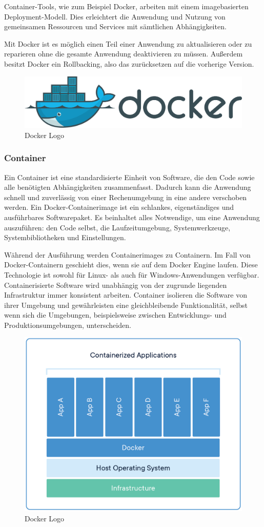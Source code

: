 Container-Tools, wie zum Beispiel Docker, arbeiten mit einem imagebasierten Deployment-Modell. Dies erleichtert die Anwendung und Nutzung von gemeinsamen Ressourcen und Services mit sämtlichen Abhängigkeiten.

Mit Docker ist es möglich einen Teil einer Anwendung zu aktualisieren oder zu reparieren ohne die gesamte Anwendung deaktivieren zu müssen. Außerdem besitzt Docker ein Rollbacking, also das zurücksetzen auf die vorherige Version.

\begin{figure}[h!]
    \centering
    \includegraphics[width=0.7\linewidth]{pics/docker-logo.png}
    \caption{Docker Logo}
    \label{fig:enter-label}
\end{figure}

\subsubsection{Container}
Ein Container ist eine standardisierte Einheit von Software, die den Code sowie alle benötigten Abhängigkeiten zusammenfasst. Dadurch kann die Anwendung schnell und zuverlässig von einer Rechenumgebung in eine andere verschoben werden. Ein Docker-Containerimage ist ein schlankes, eigenständiges und ausführbares Softwarepaket. Es beinhaltet alles Notwendige, um eine Anwendung auszuführen: den Code selbst, die Laufzeitumgebung, Systemwerkzeuge, Systembibliotheken und Einstellungen.\newline

Während der Ausführung werden Containerimages zu Containern. Im Fall von Docker-Containern geschieht dies, wenn sie auf dem Docker Engine laufen. Diese Technologie ist sowohl für Linux- als auch für Windows-Anwendungen verfügbar. Containerisierte Software wird unabhängig von der zugrunde liegenden Infrastruktur immer konsistent arbeiten. Container isolieren die Software von ihrer Umgebung und gewährleisten eine gleichbleibende Funktionalität, selbst wenn sich die Umgebungen, beispielsweise zwischen Entwicklungs- und Produktionsumgebungen, unterscheiden.

\begin{figure}[h!]
    \centering
    \includegraphics[width=0.7\linewidth]{pics/docker-container.png}
    \caption{Docker Logo}
    \label{fig:enter-label}
\end{figure}

\cite{Vorteile_Nachteile_Docker}
\cite{Was_ist_Docker}




